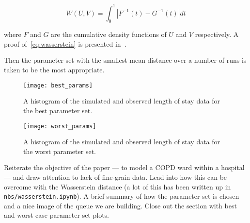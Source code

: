 \begin{equation}\label{eq:wasserstein}
    W(U, V) = \int_{0}^{1} \left\vert F^{-1}(t) - G^{-1}(t) \right\vert dt
\end{equation}

where \(F\) and \(G\) are the cumulative density functions of \(U\) and \(V\)
respectively. A proof of~\eqref{eq:wasserstein} is presented in~\cite{RTC17}.

Then the parameter set with the smallest mean distance over a number of runs is
taken to be the most appropriate.

\begin{figure}
    \centering%
    \texttt{[image: best\_params]}
    \caption{A histogram of the simulated and observed length of stay data for
             the best parameter set.}\label{fig:best_params}
\end{figure}

\begin{figure}
    \centering%
    \texttt{[image: worst\_params]}
    \caption{A histogram of the simulated and observed length of stay data for
             the worst parameter set.}\label{fig:worst_params}
\end{figure}

Reiterate the objective of the paper --- to model a COPD ward within a hospital
--- and draw attention to lack of fine-grain data. Lead into how this can be
overcome with the Wasserstein distance (a lot of this has been written up in
\texttt{nbs/wasserstein.ipynb}). A brief summary of how the parameter set is
chosen and a nice image of the queue we are building. Close out the section with
best and worst case parameter set plots.
